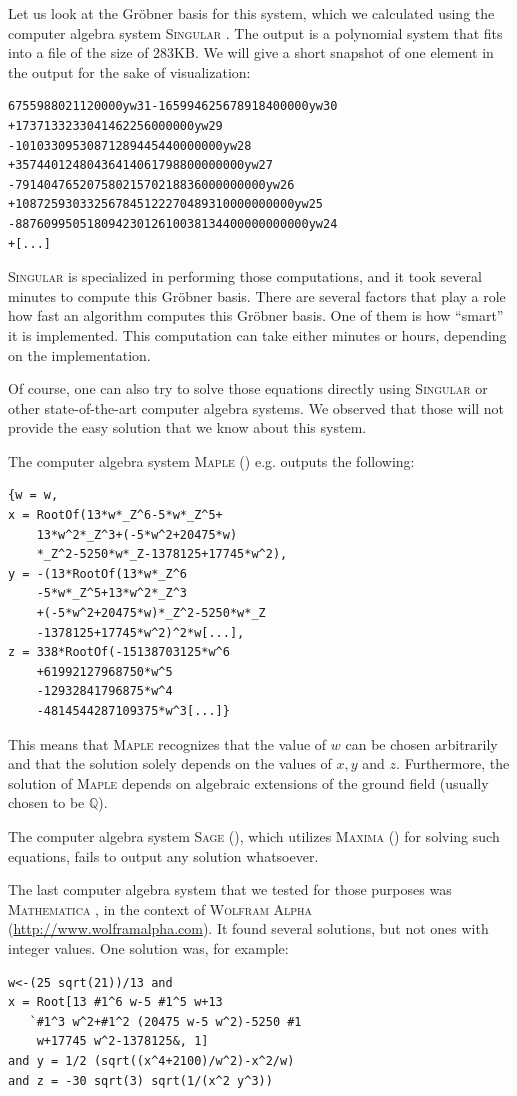 \documentclass[oribibl, twocolumn]{llncs}
\newcommand{\QQ}{{\mathbb{Q}}}
\begin{document}
Let us look at the Gr\"obner basis for this system, which we
calculated using the computer algebra system \textsc{Singular}
\cite{Singular:2012}. The output is a polynomial system that fits into
a file of the size of 283KB. We will give a short snapshot of one
element in the output for the sake of visualization:

\begin{verbatim}
6755988021120000yw31-165994625678918400000yw30
+1737133233041462256000000yw29
-10103309530871289445440000000yw28
+35744012480436414061798800000000yw27
-79140476520758021570218836000000000yw26
+108725930332567845122270489310000000000yw25
-88760995051809423012610038134400000000000yw24
+[...]
\end{verbatim}

\textsc{Singular} is specialized in performing those computations, and
it took several minutes to compute this Gr\"obner basis. There are
several factors that play a role how fast an algorithm computes this
Gr\"obner basis. One of them is how ``smart'' it is implemented. This
computation can take either minutes or hours, depending on the implementation.

Of course, one can also try to solve those equations directly using \textsc{Singular} or other 
state-of-the-art computer algebra systems. We observed that those will
not provide the easy solution that we know about this system.

The computer algebra system \textsc{Maple} (\cite{Maple}) e.g. outputs the following:
\begin{verbatim}
{w = w,
x = RootOf(13*w*_Z^6-5*w*_Z^5+
    13*w^2*_Z^3+(-5*w^2+20475*w)
    *_Z^2-5250*w*_Z-1378125+17745*w^2),
y = -(13*RootOf(13*w*_Z^6
    -5*w*_Z^5+13*w^2*_Z^3
    +(-5*w^2+20475*w)*_Z^2-5250*w*_Z
    -1378125+17745*w^2)^2*w[...],
z = 338*RootOf(-15138703125*w^6
    +61992127968750*w^5
    -12932841796875*w^4
    -4814544287109375*w^3[...]}
\end{verbatim}

This means that \textsc{Maple} recognizes that the value of $w$ can be
chosen arbitrarily and that the solution solely depends on the values
of $x,y$ and $z$. Furthermore, the solution of \textsc{Maple}
depends on algebraic extensions of the ground field (usually chosen to
be $\QQ$).

The computer algebra system \textsc{Sage} (\cite{sage}), which utilizes
\textsc{Maxima} (\cite{maxima}) for solving such equations, fails to
output any solution whatsoever.

The last computer algebra system that we tested for those purposes was
\textsc{Mathematica} \cite{wolfram1999mathematica}, in the context of
\textsc{Wolfram Alpha}\\ (\url{http://www.wolframalpha.com}). It found
several solutions, but not ones with integer values. One solution was,
for example:
\begin{verbatim}
w<-(25 sqrt(21))/13 and 
x = Root[13 #1^6 w-5 #1^5 w+13
   `#1^3 w^2+#1^2 (20475 w-5 w^2)-5250 #1
    w+17745 w^2-1378125&, 1]
and y = 1/2 (sqrt((x^4+2100)/w^2)-x^2/w)
and z = -30 sqrt(3) sqrt(1/(x^2 y^3))
\end{verbatim}
\end{document}
